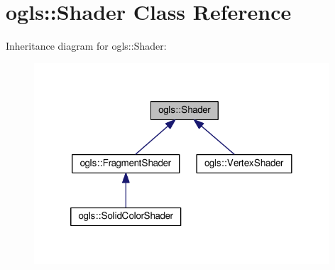 \hypertarget{classogls_1_1Shader}{\section{ogls\-:\-:Shader Class Reference}
\label{classogls_1_1Shader}
}


Inheritance diagram for ogls\-:\-:Shader\-:
\nopagebreak
\begin{figure}[H]
\begin{center}
\leavevmode
\includegraphics[width=312pt]{de/dba/classogls_1_1Shader__inherit__graph}
\end{center}
\end{figure}

